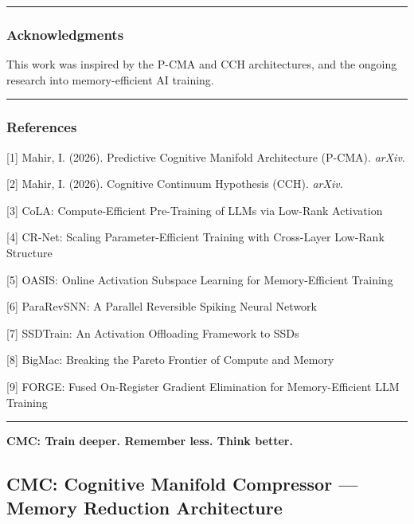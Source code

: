 \documentclass[
  11pt,
  a4paper,
]{article}
\begin{document}
\begin{center}\rule{0.5\linewidth}{0.5pt}\end{center}

\subsubsection{Acknowledgments}\label{acknowledgments}

This work was inspired by the P-CMA and CCH architectures, and the
ongoing research into memory-efficient AI training.

\begin{center}\rule{0.5\linewidth}{0.5pt}\end{center}

\subsubsection{References}\label{references-3}

{[}1{]} Mahir, I. (2026). Predictive Cognitive Manifold Architecture
(P-CMA). \emph{arXiv}.

{[}2{]} Mahir, I. (2026). Cognitive Continuum Hypothesis (CCH).
\emph{arXiv}.

{[}3{]} CoLA: Compute-Efficient Pre-Training of LLMs via Low-Rank
Activation

{[}4{]} CR-Net: Scaling Parameter-Efficient Training with Cross-Layer
Low-Rank Structure

{[}5{]} OASIS: Online Activation Subspace Learning for Memory-Efficient
Training

{[}6{]} ParaRevSNN: A Parallel Reversible Spiking Neural Network

{[}7{]} SSDTrain: An Activation Offloading Framework to SSDs

{[}8{]} BigMac: Breaking the Pareto Frontier of Compute and Memory

{[}9{]} FORGE: Fused On-Register Gradient Elimination for
Memory-Efficient LLM Training

\begin{center}\rule{0.5\linewidth}{0.5pt}\end{center}

\textbf{CMC: Train deeper. Remember less. Think better.}

\newpage

\subsection{CMC: Cognitive Manifold Compressor --- Memory Reduction
Architecture}\label{cmc-cognitive-manifold-compressor-memory-reduction-architecture}
\end{document}

